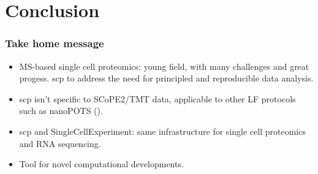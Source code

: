 \documentclass{beamer}
\newcommand{\hcode}[2][lgray]{{\ttfamily\color{vdgray}\colorbox{#1}{#2}}}
\newcommand{\frametitlesection}[1]{\frametitle{\centering #1 \footnotesize \hspace{0pt plus 1 filll} \insertsection}}
\begin{document}
\begin{frame}
\begin{columns}
\begin{column}{0.5\textwidth}
        \end{column}
    \end{columns}


\end{frame}



\section{Conclusion}


\begin{frame}
  \frametitlesection{Take home message}
  \begin{itemize}
  \item MS-based single cell proteomics: young field, with many
    challenges and great progess. \hcode{scp} to address the need for
    principled and reproducible data analysis.
  \item \hcode{scp} isn't specific to SCoPE2/TMT data, applicable to
    other LF protocols such as nanoPOTS (\citet{Williams2020-nv,Cong2020-kh}).
  \item \hcode{scp} and \hcode{SingleCellExperiment}: same
    infrastructure for single cell proteomics and RNA sequencing.
  \item Tool for novel computational developments.

  \end{itemize}
\end{frame}


\end{document}
